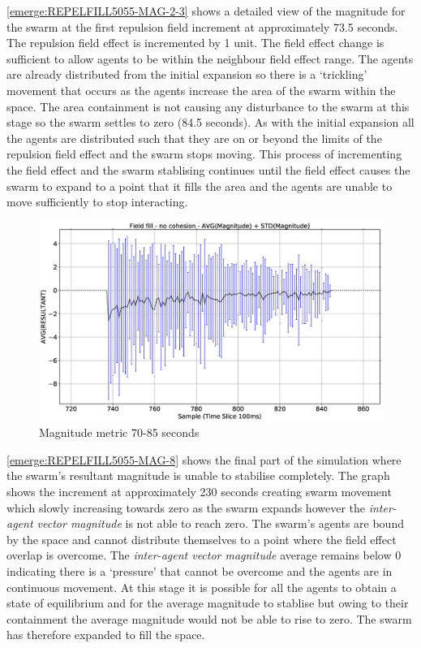 \autoref{emerge:REPELFILL5055-MAG-2-3} shows a detailed view of the magnitude for the swarm at the first repulsion field increment at approximately 73.5 seconds. The repulsion field effect is incremented by 1 unit. The field effect change is sufficient to allow agents to be within the neighbour field effect range. The agents are already distributed from the initial expansion so there is a `trickling' movement that occurs as the agents increase the area of the swarm within the space. The area containment is not causing any disturbance to the swarm at this stage so the swarm settles to zero (84.5 seconds). As with the initial expansion all the agents are distributed such that they are on or beyond the limits of the repulsion field effect and the swarm stops moving. This process of incrementing the field effect and the swarm stablising continues until the field effect causes the swarm to expand to a point that it fills the area and the agents are unable to move sufficiently to stop interacting.

\begin{figure}[H]
\begin{center}
\includegraphics[width=12cm]{CHAPTER-8/figures/REPELFILL5055-MAG-2-3}
\end{center}
\caption{Magnitude metric 70-85 seconds\label{emerge:REPELFILL5055-MAG-2-3}}
\end{figure}

\autoref{emerge:REPELFILL5055-MAG-8} shows the final part of the simulation where the swarm's resultant magnitude is unable to stabilise completely. The graph shows the increment at approximately 230 seconds creating swarm movement which slowly increasing towards zero as the swarm expands however the \textit{inter-agent vector magnitude} is not able to reach zero. The swarm's agents are bound by the space and cannot distribute themselves to a point where the field effect overlap is overcome. The \textit{inter-agent vector magnitude} average remains below 0 indicating there is a `pressure' that cannot be overcome and the agents are in continuous movement. At this stage it is possible for all the agents to obtain a state of equilibrium and for the average magnitude to stablise but owing to their containment the average magnitude would not be able to rise to zero. The swarm has therefore expanded to fill the space.

